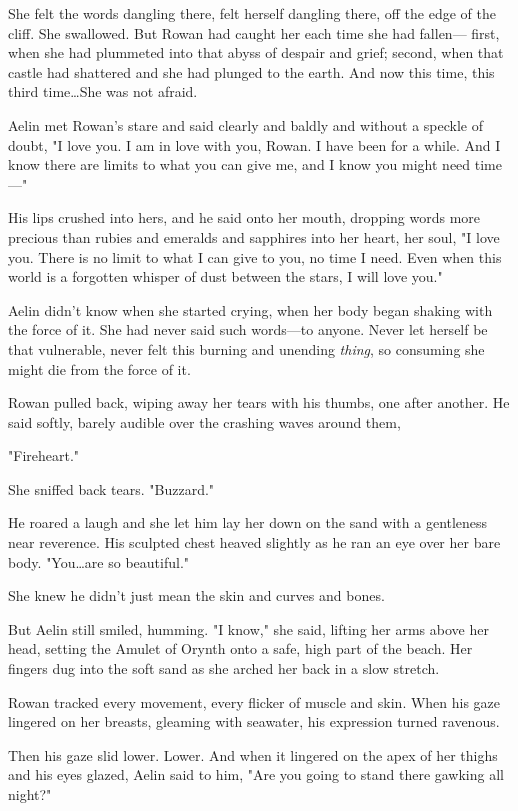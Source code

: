 She felt the words dangling there, felt herself dangling there, off the edge of the cliff.
She swallowed.
But Rowan had caught her each time she had fallen--- first, when she had plummeted into that abyss of despair and grief; second, when that castle had shattered and she had plunged to the earth.
And now this time, this third time\ldots She was not afraid.

Aelin met Rowan's stare and said clearly and baldly and without a speckle of doubt, "I love you.
I am in love with you, Rowan.
I have been for a while.
And I know there are limits to what you can give me, and I know you might need time ---"

His lips crushed into hers, and he said onto her mouth, dropping words more precious than rubies and emeralds and sapphires into her heart, her soul, "I love you.
There is no limit to what I can give to you, no time I need.
Even when this world is a forgotten whisper of dust between the stars, I will love you."

Aelin didn't know when she started crying, when her body began shaking with the force of it.
She had never said such words---to anyone.
Never let herself be that vulnerable, never felt this burning and unending \emph{thing}, so consuming she might die from the force of it.

Rowan pulled back, wiping away her tears with his thumbs, one after another.
He said softly, barely audible over the crashing waves around them,

"Fireheart."

She sniffed back tears.
"Buzzard."

He roared a laugh and she let him lay her down on the sand with a gentleness near reverence.
His sculpted chest heaved slightly as he ran an eye over her bare body.
"You\ldots are so beautiful."

She knew he didn't just mean the skin and curves and bones.

But Aelin still smiled, humming.
"I know," she said, lifting her arms above her head, setting the Amulet of Orynth onto a safe, high part of the beach.
Her fingers dug into the soft sand as she arched her back in a slow stretch.

Rowan tracked every movement, every flicker of muscle and skin.
When his gaze lingered on her breasts, gleaming with seawater, his expression turned ravenous.

Then his gaze slid lower.
Lower.
And when it lingered on the apex of her thighs and his eyes glazed, Aelin said to him, "Are you going to stand there gawking all night?"

